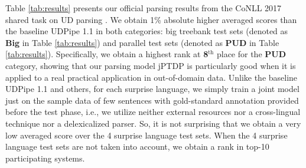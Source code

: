 \documentclass[11pt,letterpaper]{article}
\begin{document}
Table \ref{tab:results} presents our official parsing results from the CoNLL 2017 shared task on UD parsing \citep{udst:overview}. We obtain 1\% absolute higher averaged scores than the baseline UDPipe 1.1 \citep{STRAKA16.873} in both categories: big treebank test sets (denoted as \textbf{Big} in Table \ref{tab:results}) and parallel test sets (denoted as \textbf{PUD} in Table  \ref{tab:results}). Specifically, we obtain a highest rank at \textbf{8}$^{\text{th}}$ place for the \textbf{PUD} category, showing that our parsing model jPTDP is particularly good when it is applied to a real practical application in out-of-domain data. Unlike the baseline UDPipe 1.1 and others, for each surprise language, we simply train a joint model just on the sample data of few sentences with gold-standard annotation provided before the test phase, i.e., we utilize neither external resources nor a cross-lingual technique nor a delexicalized parser. So, it is not surprising that we obtain a very low averaged score over the 4 surprise language test sets. When the 4 surprise language test sets are not taken into account, we obtain a rank in top-10 participating systems.
\end{document}
